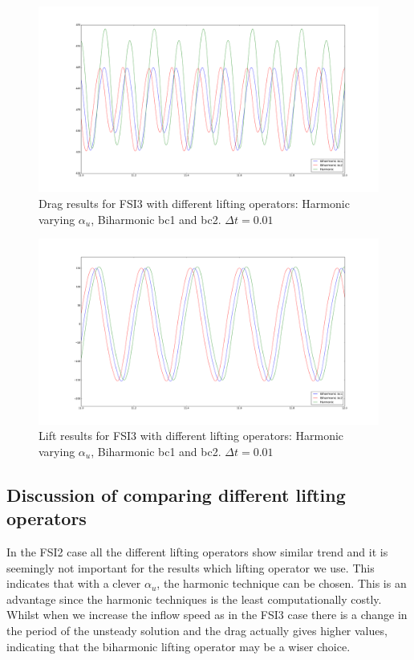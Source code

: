 \begin{figure}[]
    \label{FSI33}
    \centering
    \includegraphics[trim={3cm 3cm 3cm 3cm},scale=0.20]{./Mesh_motion_results/FSI3_dt0001_Drag.png} 
    \caption{Drag results for FSI3 with different lifting operators: Harmonic varying $\alpha_u$, Biharmonic bc1 and bc2. $\Delta t = 0.01$}
\end{figure}
\begin{figure}[]
    \label{FSI34}
    \centering
    \includegraphics[trim={3cm 3cm 3cm 3cm},scale=0.20]{./Mesh_motion_results/FSI3_dt0001_Lift.png} 
    \caption{Lift results for FSI3 with different lifting operators: Harmonic varying $\alpha_u$, Biharmonic bc1 and bc2. $\Delta t = 0.01$}
\end{figure}

\subsection*{Discussion of comparing different lifting operators}
In the FSI2 case all the different lifting operators show similar trend and it is seemingly not important for the results which lifting operator we use. This indicates that with a clever $\alpha_u$, the harmonic technique can be chosen. This is an advantage since the harmonic techniques is the least computationally costly. Whilst when we increase the inflow speed as in the FSI3 case there is a change in the period of the unsteady solution and the drag actually gives higher values, indicating that the biharmonic lifting operator may be a wiser choice.

